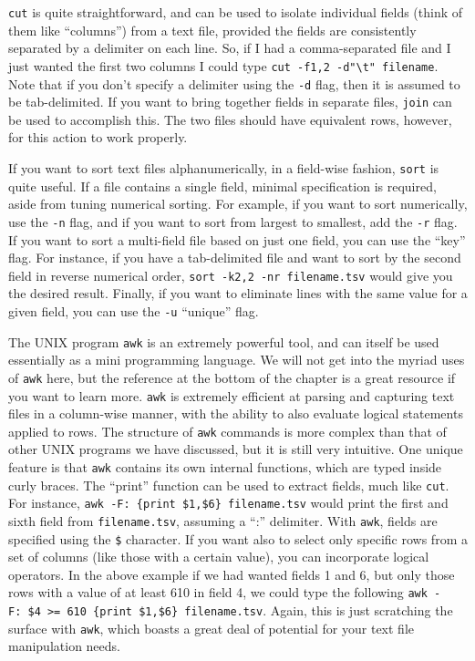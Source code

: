 \documentclass[]{book}
\begin{document}
\texttt{cut} is quite straightforward, and can be used to isolate individual fields (think of them like ``columns'') from a text file, provided the fields are consistently separated by a delimiter on each line. So, if I had a comma-separated file and I just wanted the first two columns I could type \texttt{cut\ -f1,2\ -d"\textbackslash{}t"\ filename}. Note that if you don't specify a delimiter using the \texttt{-d} flag, then it is assumed to be tab-delimited. If you want to bring together fields in separate files, \texttt{join} can be used to accomplish this. The two files should have equivalent rows, however, for this action to work properly.

If you want to sort text files alphanumerically, in a field-wise fashion, \texttt{sort} is quite useful. If a file contains a single field, minimal specification is required, aside from tuning numerical sorting. For example, if you want to sort numerically, use the \texttt{-n} flag, and if you want to sort from largest to smallest, add the \texttt{-r} flag. If you want to sort a multi-field file based on just one field, you can use the ``key'' flag. For instance, if you have a tab-delimited file and want to sort by the second field in reverse numerical order, \texttt{sort\ -k2,2\ -nr\ filename.tsv} would give you the desired result. Finally, if you want to eliminate lines with the same value for a given field, you can use the \texttt{-u} ``unique'' flag.

The UNIX program \texttt{awk} is an extremely powerful tool, and can itself be used essentially as a mini programming language. We will not get into the myriad uses of \texttt{awk} here, but the reference at the bottom of the chapter is a great resource if you want to learn more. \texttt{awk} is extremely efficient at parsing and capturing text files in a column-wise manner, with the ability to also evaluate logical statements applied to rows. The structure of \texttt{awk} commands is more complex than that of other UNIX programs we have discussed, but it is still very intuitive. One unique feature is that \texttt{awk} contains its own internal functions, which are typed inside curly braces. The ``print'' function can be used to extract fields, much like \texttt{cut}. For instance, \texttt{awk\ -F:\ \textquotesingle{}\{print\ \$1,\$6\}\textquotesingle{}\ filename.tsv} would print the first and sixth field from \texttt{filename.tsv}, assuming a ``:'' delimiter. With \texttt{awk}, fields are specified using the \texttt{\$} character. If you want also to select only specific rows from a set of columns (like those with a certain value), you can incorporate logical operators. In the above example if we had wanted fields 1 and 6, but only those rows with a value of at least 610 in field 4, we could type the following \texttt{awk\ -F:\ \textquotesingle{}\$4\ \textgreater{}=\ 610\ \{print\ \$1,\$6\}\textquotesingle{}\ filename.tsv}. Again, this is just scratching the surface with \texttt{awk}, which boasts a great deal of potential for your text file manipulation needs.
\end{document}
